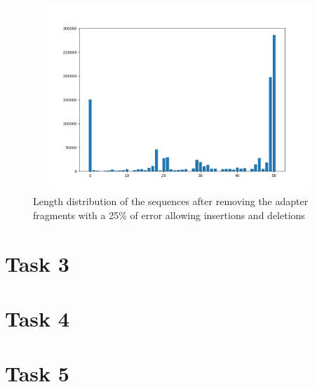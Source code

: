 \documentclass[a4paper,10pt]{article}
\begin{document}
\begin{figure}[H]
    \centering
    \includegraphics[width=11cm, height=7cm]{images/length-distr-25-id.png}
    \caption{Length distribution of the sequences after removing the adapter fragments with a 25\% of error allowing insertions and deletions}
    \label{length-distr-25-id}
\end{figure}

\newpage

\section{Task 3}

\newpage

\section{Task 4}

\newpage

\section{Task 5}

\newpage

\listoffigures

\listoftables
\end{document}

